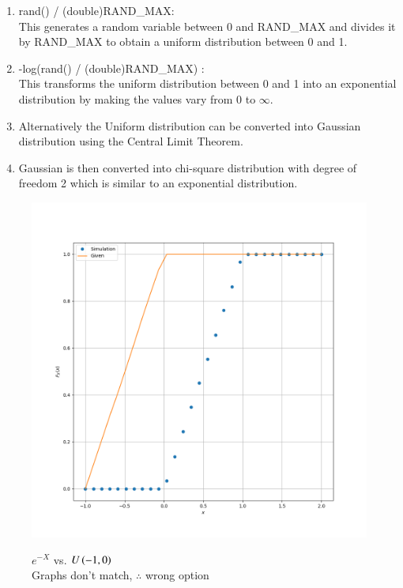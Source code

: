 \documentclass[book,11pt]{IEEEtran}
\begin{document}
\begin{enumerate}[label=(\Alph*)]
\begin{enumerate}[label=(\roman*)]
\item rand() / (double)RAND\_MAX:\\ This generates a random variable between 0 and RAND\_MAX and divides it by RAND\_MAX to obtain a uniform distribution between 0 and 1.
\item -log(rand() / (double)RAND\_MAX) :\\ This transforms the uniform distribution between 0 and 1 into an exponential distribution by making the values vary from 0 to $\infty$.
\item Alternatively the Uniform distribution can be converted into Gaussian distribution using the Central Limit Theorem.
\item Gaussian is then converted into chi-square distribution with degree of freedom 2 which is similar to an exponential distribution.
\end{enumerate}
\end{enumerate} 
\begin{figure}[H]
	\centering
	\includegraphics[width=\columnwidth]{2023/ST/53/figs/cdf_comp_1.png}
	\label{fig:i_2023/st/53/1}
	\caption{$e^{-X}$ vs. $U\left(-1,0\right)$\\Graphs don't match, $\therefore$ wrong option}
\end{figure}
\end{document}
